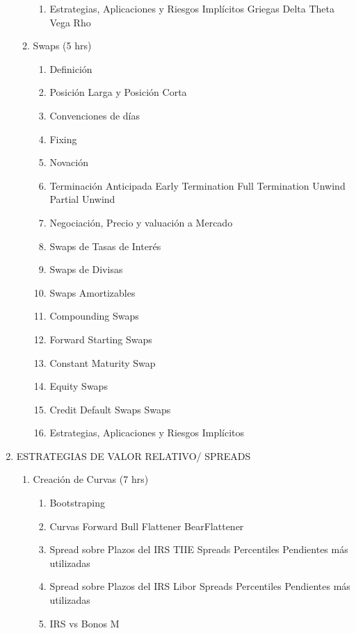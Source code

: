 \documentclass{article}
\begin{document}
\begin{enumerate}
\begin{enumerate}
\begin{enumerate}
        \item Estrategias, Aplicaciones y Riesgos Implícitos
            \subitem Griegas
                \subsubitem Delta
                \subsubitem Theta
                \subsubitem Vega
                \subsubitem Rho
        \end{enumerate}
        \item Swaps (5 hrs)
        \begin{enumerate}
            \item Definición
            \item Posición Larga y Posición Corta
            \item Convenciones de días
            \item Fixing
            \item Novación
            \item Terminación Anticipada    
            \subitem Early Termination
            \subitem Full Termination
            \subitem Unwind
            \subitem Partial Unwind
            \item Negociación, Precio y valuación a Mercado  
            \item Swaps de Tasas de Interés
            \item Swaps de Divisas
            \item Swaps Amortizables
            \item Compounding Swaps 
            \item Forward Starting Swaps
            \item Constant Maturity Swap   
            \item Equity Swaps
            \item Credit Default Swaps Swaps
            \item Estrategias, Aplicaciones y Riesgos Implícitos
    \end{enumerate}
    \end{enumerate}
    \item ESTRATEGIAS DE VALOR RELATIVO/ SPREADS
    \begin{enumerate}
        \item  Creación de Curvas (7 hrs)
        \begin{enumerate}
            \item Bootstraping
            \item Curvas Forward
            \subitem Bull Flattener
            \subitem BearFlattener
            \item Spread sobre Plazos del IRS TIIE
            \subitem Spreads
            \subitem Percentiles
            \subitem Pendientes más utilizadas
            \item Spread sobre Plazos del IRS Libor
            \subitem Spreads
            \subitem Percentiles
            \subitem Pendientes más utilizadas
            \item IRS vs Bonos M
    \end{enumerate}
    \end{enumerate}
\end{enumerate}
\end{document}
